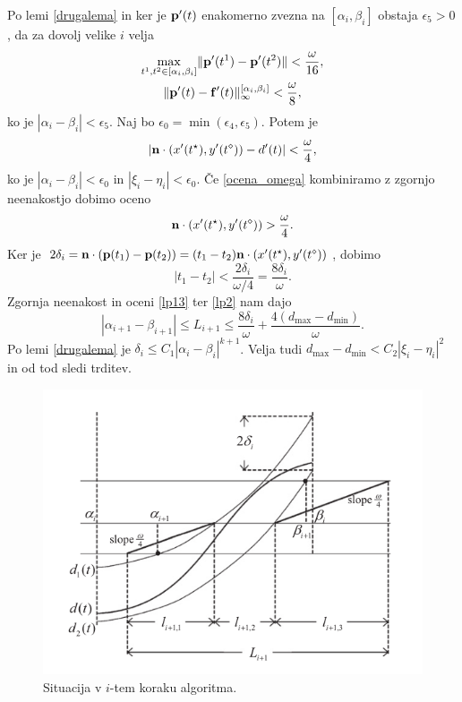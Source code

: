 Po lemi \ref{drugalema} in ker je ${\bf p'}(t)$ enakomerno zvezna na $[\alpha _i,\beta _i]$ obstaja $\epsilon _5 > 0$, da za dovolj velike $i$ velja 
\begin{gather*}
\max _{t^1,t^2\in [\alpha _i,\beta _i]} \lVert {\bf p}'(t^1) - {\bf p}'(t^2)\rVert < \frac{\omega}{16},\\
\lVert {\bf p}'(t) - {\bf f}'(t)\rVert _{\infty}^{[\alpha _i,\beta _i]} < \frac{\omega}{8},
\end{gather*}
ko je $|\alpha _i - \beta _i| < \epsilon _5$. Naj bo $\epsilon _0 = \min (\epsilon _4, \epsilon _5)$. Potem je 
$$
|{\bf n}\cdot (x'(t^\star), y'(t^\diamond)) - d'(t)| < \frac{\omega}{4},
$$
ko je $|\alpha _i - \beta _i| < \epsilon _0$ in $|\xi _i - \eta _i| < \epsilon _0$.
Če \ref{ocena_omega} kombiniramo z zgornjo neenakostjo dobimo oceno
$$
{\bf n}\cdot (x'(t^\star), y'(t^\diamond)) > \frac{\omega}{4}.
$$
Ker je $2\delta _i = {\bf n}\cdot({\bf p}(t_1) - {\bf p}(t_2)) = (t_1-t_2){\bf n}\cdot(x'(t^\star),y'(t^\diamond))$, dobimo
$$
|t_1-t_2| < \frac{2\delta _i}{\omega /4 } = \frac{8\delta _i}{\omega}.
$$
Zgornja neenakost in oceni \ref{lp13} ter \ref{lp2} nam dajo 
$$
|\alpha _{i+1}-\beta _{i+1}| \leq L_{i+1} \leq \frac{8\delta _i}{\omega} + 
\frac{4(d_{\text{max}} - d_{\text{min}})}{\omega}.
$$
Po lemi \ref{drugalema} je $\delta _i\leq {C_1} |\alpha _i-\beta _i|^{k+1}$. Velja tudi $d_{\text{max}} - d_{\text{min}} < C_2 |\xi _i-\eta _i|^2$ in od tod sledi trditev.
\endproof


\begin{figure}[!h]
  \begin{center}
    \includegraphics[width=0.7\linewidth]{1}
  \caption{Situacija v $i$-tem koraku algoritma.}
  \label{slika1}
  \end{center}
\end{figure}